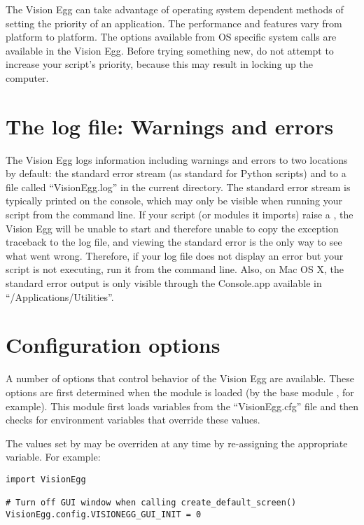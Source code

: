 \documentclass{manual}
\begin{document}
The Vision Egg can take advantage of operating system dependent
methods of setting the priority of an application.  The performance
and features vary from platform to platform.  The options available
from OS specific system calls are available in the Vision Egg.  Before
trying something new, do not attempt to increase your script's
priority, because this may result in locking up the computer.

\section{The log file: Warnings and errors}

The Vision Egg logs information including warnings and errors to two
locations by default: the standard error stream (as standard for
Python scripts) and to a file called ``VisionEgg.log'' in the current
directory.  The standard error stream is typically printed on the
console, which may only be visible when running your script from the
command line.  If your script (or modules it imports) raise a
, the Vision Egg will be unable to start and
therefore unable to copy the exception traceback to the log file, and
viewing the standard error is the only way to see what went wrong.
Therefore, if your log file does not display an error but your script
is not executing, run it from the command line.  Also, on Mac OS X,
the standard error output is only visible through the Console.app
available in ``/Applications/Utilities''.

\section{Configuration options}

A number of options that control behavior of the Vision Egg are
available.  These options are first determined when the
 module is loaded (by the base module
, for example).  This module first loads variables
from the ``VisionEgg.cfg'' file and then checks for environment
variables that override these values.

The values set by  may be overriden at
any time by re-assigning the appropriate variable.  For example:

\begin{verbatim}
import VisionEgg

# Turn off GUI window when calling create_default_screen()
VisionEgg.config.VISIONEGG_GUI_INIT = 0
\end{verbatim}
\end{document}

